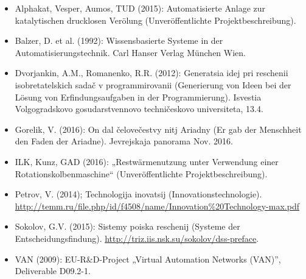 \documentclass[11pt,a4paper]{article}
\begin{document}
\begin{itemize}
\item  Alphakat, Vesper, Aumos, TUD (2015): Automatisierte Anlage zur
  katalytischen drucklosen Verölung (Unveröffentlichte Projektbeschreibung).
\item  Balzer, D. et al. (1992): Wissensbasierte Systeme in der
  Automatisierungstechnik. Carl Hanser Verlag München Wien.
\item  Dvorjankin, A.M., Romanenko, R.R. (2012): Generatsia idej pri
  reschenii isobretatelskich sada\v{c} v programmirovanii (Generierung von
  Ideen bei der Lösung von Erfindungsaufgaben in der Programmierung).  Isvestia
  Volgogradskovo gosudarstvennovo techni\v{c}eskovo universiteta, 13.4.
\item  Gorelik, V. (2016): On dal \v{c}elove\v{c}estvy nitj Ariadny (Er gab
  der Menschheit den Faden der Ariadne).  Jevrejskaja panorama Nov. 2016.
\item  ILK, Kunz, GAD (2016): „Restwärmenutzung unter Verwendung einer
  Rotationskolbenmaschine“ (Unveröffentlichte Projektbeschreibung).
\item  Petrov, V. (2014); Technologija inovatsij
  (Innovationstechnologie). \\
  \url{http://temm.ru/file.php/id/f4508/name/Innovation\%20Technology-max.pdf}
\item  Sokolov, G.V. (2015): Sistemy poiska reschenij (Systeme der
  Entscheidungsfindung). \url{http://triz.iis.nsk.su/sokolov/dss-preface}.
\item  VAN (2009): EU-R\&D-Project „Virtual Automation Networks
  (VAN)”, Deliverable D09.2-1.
\end{itemize}
\end{document}
